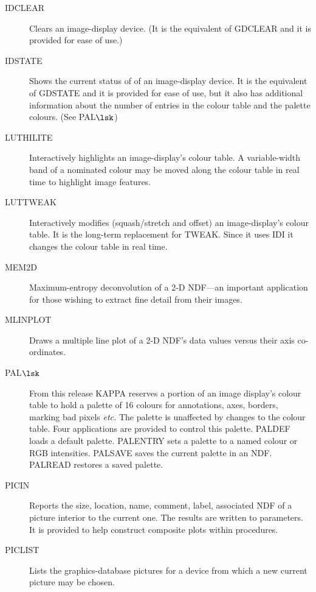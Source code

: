 {\begin{description}
  \item [IDCLEAR]  Clears an image-display device. (It is the equivalent of
    GDCLEAR and it is provided for ease of use.)

  \item [IDSTATE]  Shows the current status of of an image-display device.
    It is the equivalent of GDSTATE and it is provided for ease of
    use, but it also has additional information about the number of
    entries in the colour table and the palette colours. (See PAL$\lsk$)

  \item [LUTHILITE]  Interactively highlights an image-display's colour 
    table.  A variable-width band of a nominated colour may be moved
    along the colour table in real time to highlight image features.

  \item [LUTTWEAK]  Interactively modifies (squash/stretch and offset) an
    image-display's colour table.  It is the long-term replacement
    for TWEAK.  Since it uses IDI it changes the colour table in real 
    time.

  \item [MEM2D]  Maximum-entropy deconvolution of a 2-D NDF---an important
    application for those wishing to extract fine detail from their
    images.

  \item [MLINPLOT]  Draws a multiple line plot of a 2-D NDF's data values
    versus their axis co-ordinates.

  \item [PAL$\lsk$]  From this release {\small KAPPA} reserves a portion of
    an image display's colour table to hold a palette of 16 colours for
    annotations, axes, borders, marking bad pixels {\it etc.}  The palette
    is unaffected by changes to the colour table.  Four applications
    are provided to control this palette.  PALDEF loads a default
    palette. PALENTRY sets a palette to a named colour or RGB 
    intensities. PALSAVE saves the current palette in an NDF.  PALREAD
    restores a saved palette.

  \item [PICIN]  Reports the size, location, name, comment, label,
    associated NDF of a picture interior to the current one. The
    results are written to parameters.  It is provided to help
    construct composite plots within procedures.

  \item [PICLIST]  Lists the graphics-database pictures for a device from 
    which a new current picture may be chosen.


\end{description}}
